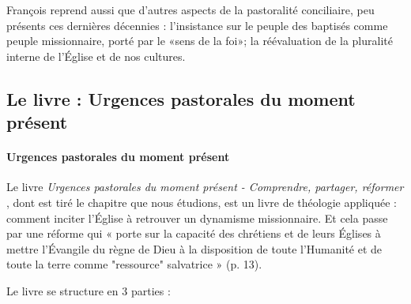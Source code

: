 François reprend aussi que d'autres aspects de la pastoralité conciliaire, peu présents ces dernières décennies : l'insistance sur le peuple des baptisés comme peuple missionnaire, porté par le «sens de la foi»; la réévaluation de la pluralité interne de l'Église et de nos cultures. \cite{theobald_pastoralite_2021}



\subsection{Le livre : Urgences pastorales du moment présent}

\paragraph{Urgences pastorales du moment présent} Le livre \textit{Urgences pastorales du moment présent - Comprendre, partager, réformer} \cite{theobald_urgences_2017}, dont est tiré le chapitre que nous étudions, est un livre de théologie appliquée :   comment inciter l’Église à retrouver un dynamisme missionnaire. Et cela passe par une réforme qui « porte sur la capacité des chrétiens et de leurs Églises à mettre l’Évangile du règne de Dieu à la disposition de toute l’Humanité et de toute la terre comme "ressource" salvatrice » (p. 13).


 Le livre se structure en 3 parties : 

